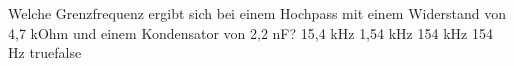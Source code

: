     {Welche Grenzfrequenz ergibt sich bei einem Hochpass mit einem Widerstand von 4,7 kOhm und einem Kondensator von 2,2 nF?}
    {15,4 kHz}
    {1,54 kHz}
    {154 kHz}
    {154 Hz}
    {true}{false}
